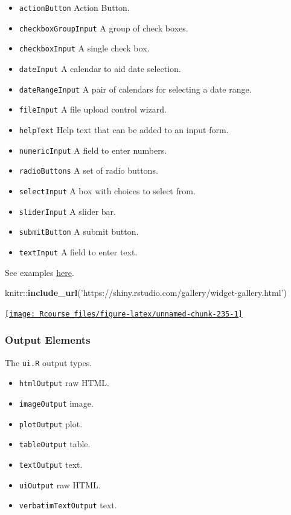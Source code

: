\documentclass[]{book}
\newenvironment{Shaded}{\begin{snugshade}}{\end{snugshade}}
\newcommand{\KeywordTok}[1]{\textcolor[rgb]{0.13,0.29,0.53}{\textbf{{#1}}}}
\newcommand{\StringTok}[1]{\textcolor[rgb]{0.31,0.60,0.02}{{#1}}}
\newcommand{\NormalTok}[1]{{#1}}
\providecommand{\tightlist}{%
  \setlength{\itemsep}{0pt}\setlength{\parskip}{0pt}}
\theoremstyle{definition}
\theoremstyle{definition}
\theoremstyle{remark}
\begin{document}
\begin{itemize}
\tightlist
\item
  \texttt{actionButton} Action Button.
\item
  \texttt{checkboxGroupInput} A group of check boxes.
\item
  \texttt{checkboxInput} A single check box.
\item
  \texttt{dateInput} A calendar to aid date selection.
\item
  \texttt{dateRangeInput} A pair of calendars for selecting a date
  range.
\item
  \texttt{fileInput} A file upload control wizard.
\item
  \texttt{helpText} Help text that can be added to an input form.
\item
  \texttt{numericInput} A field to enter numbers.
\item
  \texttt{radioButtons} A set of radio buttons.
\item
  \texttt{selectInput} A box with choices to select from.
\item
  \texttt{sliderInput} A slider bar.
\item
  \texttt{submitButton} A submit button.
\item
  \texttt{textInput} A field to enter text.
\end{itemize}

See examples
\href{https://shiny.rstudio.com/gallery/widget-gallery.html}{here}.

\begin{Shaded}
\begin{Highlighting}[]
\NormalTok{knitr::}\KeywordTok{include_url}\NormalTok{(}\StringTok{'https://shiny.rstudio.com/gallery/widget-gallery.html'}\NormalTok{)}
\end{Highlighting}
\end{Shaded}

\href{https://shiny.rstudio.com/gallery/widget-gallery.html}{\texttt{[image: Rcourse\_files/figure-latex/unnamed-chunk-235-1]} }

\subsubsection{Output Elements}\label{output-elements}

The \texttt{ui.R} output types.

\begin{itemize}
\tightlist
\item
  \texttt{htmlOutput} raw HTML.
\item
  \texttt{imageOutput} image.
\item
  \texttt{plotOutput} plot.
\item
  \texttt{tableOutput} table.
\item
  \texttt{textOutput} text.
\item
  \texttt{uiOutput} raw HTML.
\item
  \texttt{verbatimTextOutput} text.
\end{itemize}
\end{document}
